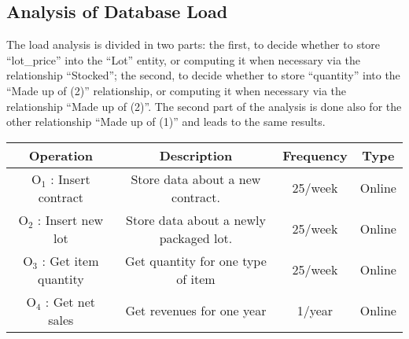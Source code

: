 \newpage
\subsection{Analysis of Database Load}
The load analysis is divided in two parts: the first, to decide whether to store ``lot\_price'' into the ``Lot'' entity, or computing it when necessary via the relationship ``Stocked''; the second, to decide whether to store ``quantity'' into the ``Made up of (2)'' relationship, or computing it when necessary via the relationship ``Made up of (2)''. The second part of the analysis is done also for the other relationship ``Made up of (1)'' and leads to the same results.
\begin{table}[!h]
	\begin{center}
		\begin{tabular}{ | c | c | c | c | }
			\hline
			\textbf{Operation} & \textbf{Description} & \textbf{Frequency} & \textbf{Type} \\ \hline
			$ \textrm{O}_\textrm{1} $ : Insert contract & Store data about a new contract. & 25/week & Online \\ \hline
			$ \textrm{O}_\textrm{2} $ : Insert new lot & Store data about a newly packaged lot. & 25/week & Online \\ \hline
			$ \textrm{O}_\textrm{3} $ : Get item quantity  & Get quantity for one type of item & 25/week & Online \\\hline
			$ \textrm{O}_\textrm{4} $ : Get net sales  & Get revenues for one year & 1/year & Online \\\hline
		\end{tabular}
	\end{center}
\end{table}

